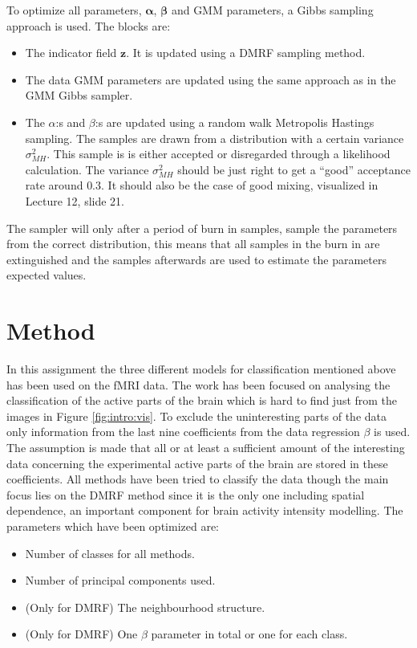 \documentclass[a4paper,english]{article}
\begin{document}
To optimize all parameters, $\boldsymbol{\alpha}$, $\boldsymbol{\beta}$ and GMM parameters, a Gibbs sampling approach is used.
The blocks are:
\begin{itemize}
  \item The indicator field $\boldsymbol{z}$. It is updated using a DMRF sampling method.
  \item The data GMM parameters are updated using the same approach as in the GMM Gibbs sampler.
  \item The $\alpha$:s and $\beta$:s are updated using a random walk Metropolis Hastings sampling.
    The samples are drawn from a distribution with a certain variance $\sigma_{MH}^2$.
    This sample is is either accepted or disregarded through a likelihood calculation.
    The variance $\sigma_{MH}^2$ should be just right to get a ``good'' acceptance rate around $0.3$.
    It should also be the case of good mixing, visualized in Lecture 12, slide 21\cite{L12}.
\end{itemize}
The sampler will only after a period of burn in samples, sample the parameters from the correct distribution, this means that all samples in the burn in are extinguished and the samples afterwards are used to estimate the parameters expected values.


\section{Method}
In this assignment the three different models for classification mentioned above has been used on the fMRI data.
The work has been focused on analysing the classification of the active parts of the brain which is hard to find just from the images in Figure \ref{fig:intro:vis}.
To exclude the uninteresting parts of the data only information from the last nine coefficients from the data regression $\beta$ is used.
The assumption is made that all or at least a sufficient amount of the interesting data concerning the experimental active parts of the brain are stored in these coefficients.
All methods have been tried to classify the data though the main focus lies on the DMRF method since it is the only one including spatial dependence, an important component for brain activity intensity modelling.
The parameters which have been optimized are:
\begin{itemize}
  \item Number of classes for all methods.
  \item Number of principal components used.
  \item (Only for DMRF) The neighbourhood structure.
  \item (Only for DMRF) One $\beta$ parameter in total or one for each class.
\end{itemize}
\end{document}
